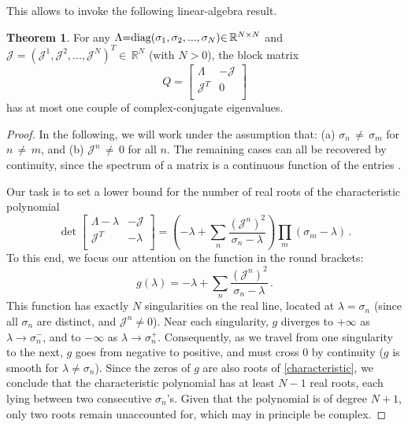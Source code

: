 \documentclass[a4paper, amsfonts, amssymb, amsmath, reprint, showkeys, nofootinbib, twoside,notitlepage,onecolumn]{revtex4-1}
\theoremstyle{definition}
\theoremstyle{theorem}
\newtheorem{theorem}{Theorem}
\begin{document}
This allows to invoke the following linear-algebra result.
\begin{theorem}
For any $\Lambda{=}\textup{diag}(\sigma_1,\sigma_2,...,\sigma_N){\in}\, \mathbb{R}^{N\times N}$ and $\mathcal{J}{=}(\mathcal{J}^1,\mathcal{J}^2,...,\mathcal{J}^N)^T{\in}\, \mathbb{R}^N$ (with $N{>}0$), the block matrix
\begin{equation}
Q=
\left[\begin{array}{c|c}
\Lambda & -\mathcal{J} \\
\hline
\mathcal{J}^T & 0 \\
\end{array}\right]
\end{equation}
has at most one couple of complex-conjugate eigenvalues.
\end{theorem}
\begin{proof}
In the following, we will work under the assumption that: (a) $\sigma_n\,{\neq}\, \sigma_m$ for $n\,{\neq}\, m$, and (b) $\mathcal{J}^n \,{\neq}\, 0$ for all $n$. The remaining cases can all be recovered by continuity, since the spectrum of a matrix is a continuous function of the entries \cite[\S 2.5.1]{Kato2008}. 

Our task is to set a lower bound for the number of real roots of the characteristic polynomial
\begin{equation}\label{characteristic}
\det \left[\begin{array}{c|c}
\Lambda-\lambda & -\mathcal{J} \\
\hline
\mathcal{J}^T & -\lambda \\
\end{array}\right] = \left(-\lambda +\sum_n \dfrac{(\mathcal{J}^n)^2}{\sigma_n -\lambda} \right) \prod_m (\sigma_m -\lambda)\, .
\end{equation}
To this end, we focus our attention on the function in the round brackets:
\begin{equation}
g(\lambda)= -\lambda +\sum_n \dfrac{(\mathcal{J}^n)^2}{\sigma_n -\lambda} \, .
\end{equation}
This function has exactly $N$ singularities on the real line, located at $\lambda=\sigma_n$ (since all $\sigma_n$ are distinct, and $\mathcal{J}^n\neq 0$). Near each singularity, $g$ diverges to $+\infty$ as $\lambda\to\sigma_n^-$, and to $-\infty$ as $\lambda\to\sigma_n^+$. Consequently, as we travel from one singularity to the next, $g$ goes from negative to positive, and must cross 0 by continuity ($g$ is smooth for $\lambda\neq \sigma_n$). Since the zeros of $g$ are also roots of \eqref{characteristic}, we conclude that the characteristic polynomial has at least $N-1$ real roots, each lying between two consecutive $\sigma_n$’s. Given that the polynomial is of degree $N+1$, only two roots remain unaccounted for, which may in principle be complex.
\end{proof}
\end{document}
